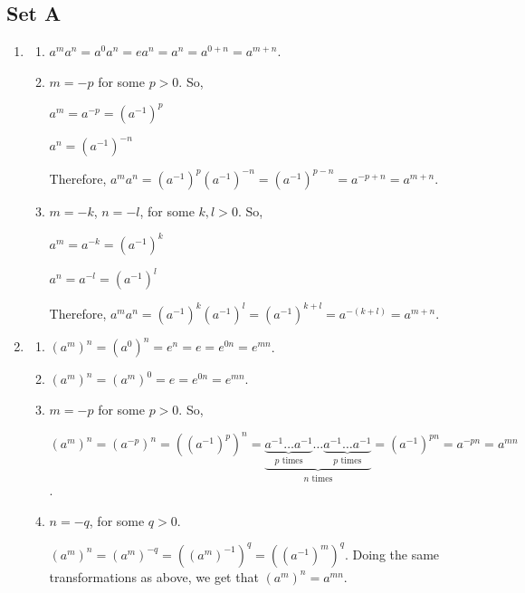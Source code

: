 \documentclass{article}
\begin{document}
\subsection{Set A}
\begin{enumerate}
    \item
        \begin{enumerate}
            \item $ a^ma^n = a^0a^n = ea^n  = a^n = a^{0 + n} = a^{m + n} $.
            
            \item $ m = -p $ for some $  p > 0 $. So,

            $ a^m = a^{-p} = (a^{-1})^p $

            $ a^n = (a^{-1})^{-n} $

            Therefore, $ a^ma^n = (a^{-1})^p(a^{-1})^{-n} = (a^{-1})^{p - n} = a^{-p + n} = a^{m + n} $.

            \item $ m = -k $, $ n = -l $, for some $ k, l > 0 $. So,

            $ a^m = a^{-k} = (a^{-1})^k $

            $ a^n = a^{-l} = (a^{-1})^l $

            Therefore, $ a^ma^n = (a^{-1})^k(a^{-1})^l = (a^{-1})^{k + l} = a^{-(k + l)} = a^{m + n} $.
        \end{enumerate}

    \item
        \begin{enumerate}
            \item $ (a^m)^n = (a^0)^n = e^n = e = e^{0n} = e^{mn} $.

            \item $ (a^m)^n = (a^m)^0 = e = e^{0n} = e^{mn} $.

            \item $ m = -p $ for some $  p > 0 $. So,
            
            $ (a^{m})^n = (a^{-p})^n = ((a^{-1})^p)^n = \underbrace{\underbrace{a^{-1}\ldots a^{-1}}_{\text{$p$ times}}\ldots \underbrace{a^{-1}\ldots a^{-1}}_{\text{$p$ times}}}_{\text{$n$ times}} = (a^{-1})^{pn} = a^{-pn} = a^{mn} $.

            \item $ n = -q $, for some $ q > 0 $.
            
            $ (a^m)^n = (a^m)^{-q} = ((a^m)^{-1})^q = ((a^{-1})^m)^q $. Doing the same transformations as above, we get that $ (a^m)^n = a^{mn} $.


\end{enumerate}
\end{enumerate}
\end{document}
